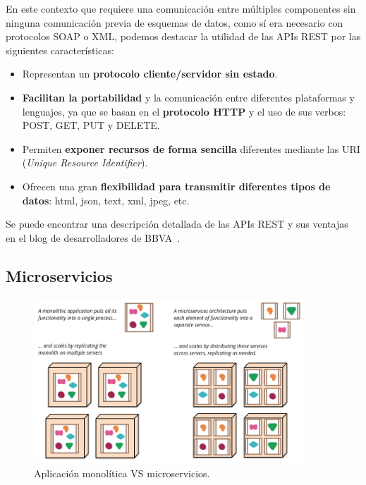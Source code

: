 En este contexto que requiere una comunicación entre múltiples componentes sin ninguna comunicación previa de esquemas de datos, como sí era necesario con protocolos SOAP o XML, podemos destacar la utilidad de las APIs REST por las siguientes características:

\begin{itemize}
\item Representan un \textbf{protocolo cliente/servidor sin estado}.
\item \textbf{ Facilitan la portabilidad} y la comunicación entre diferentes plataformas y lenguajes, ya que se basan en el \textbf{protocolo HTTP} y el uso de sus verbos: POST, GET, PUT y DELETE.
\item Permiten \textbf{exponer recursos de forma sencilla} diferentes  mediante las URI (\textit{Unique Resource Identifier}).
\item Ofrecen una gran \textbf{flexibilidad para transmitir diferentes tipos de datos}: html, json, text, xml, jpeg, etc.
\end{itemize}

Se puede encontrar una descripción detallada de las APIs REST y sus ventajas en el blog de desarrolladores de BBVA~\cite{restapi}.

\subsection{Microservicios}\label{sec:micro}
\begin{figure}
\centering
\includegraphics[width=0.9\textwidth]{sketch.png}
\caption{\label{fig:msv}Aplicación monolítica VS microservicios.}
\end{figure}

